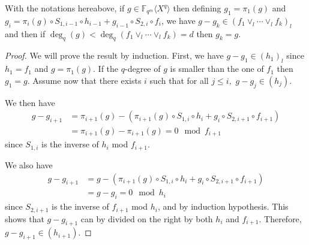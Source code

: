 \documentclass[10pt,a4paper]{amsart}
\begin{document}
\begin{theorem}
      \label{CRT}With the notations hereabove, if $g \in \mathbb{F}_{q^m} \langle
            X^q \rangle$ then defining $g_1 = \pi_1 (g)$ and $g_i = \pi_i(g) \circ S_{1, i-1} \circ h_{i-1} + g_{i-1} \circ S_{2, i} \circ f_i$, we have
      $g - g_k \in (f_1 \vee_l \cdots \vee_l f_k)_l$ and then if $\deg_q
            (g) < \deg_q (f_1 \vee_l \cdots \vee_l f_k) = d$ then $g_k = g$.
\end{theorem}

\begin{proof}
      We will prove the result by induction. First, we have $g - g_1 \in (h_1)_l$
      since $h_1 = f_1$ and $g = \pi_1 (g)$. If the $q$-degree of $g$ is
      smaller than the one of $f_1$ then $g_1 = g$.   Assume now that there exists $i$ such that for all $j\leqslant i,$ $g - g_j \in
            (h_j)$.

      \noindent We then have \begin{align*} g-g_{i+1} & =\pi_{i+1}(g) - (\pi_{i+1}(g) \circ S_{1, i} \circ h_{i} + g_{i} \circ S_{2, i+1} \circ f_{i+1}) \\
                               & = \pi_{i+1}(g) - \pi_{i+1}(g) = 0   \mod f_{i+1}\end{align*} since $ S_{1, i}$ is the inverse of $h_{i}$ mod $f_{i+1}.$

      \noindent We also have \begin{align*}
            g-g_{i+1} & = g - (\pi_{i+1}(g) \circ S_{1, i} \circ h_{i} + g_{i} \circ S_{2, i+1} \circ f_{i+1}) \\
                      & =g- g_{i} =0
            \mod h_{i}
      \end{align*}  since $ S_{2, i+1}$ is the inverse of  $f_{i+1}$ mod $h_{i}$, and by induction hypothesis.
      This shows that $g-g_{i+1} $ can by divided on the right by both $h_i$ and $f_{i+1}$. Therefore, $g - g_{i+1} \in
            (h_{i+1})$.
\end{proof}
\end{document}
